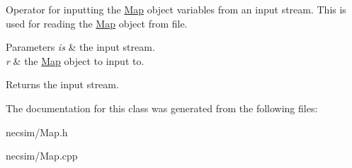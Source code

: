 Operator for inputting the \hyperlink{class_map}{Map} object variables from an input stream. This is used for reading the \hyperlink{class_map}{Map} object from file. 


\begin{DoxyParams}{Parameters}
{\em is} & the input stream. \\
\hline
{\em r} & the \hyperlink{class_map}{Map} object to input to. \\
\hline
\end{DoxyParams}
\begin{DoxyReturn}{Returns}
the input stream. 
\end{DoxyReturn}


The documentation for this class was generated from the following files\+:\begin{DoxyCompactItemize}
\item 
necsim/Map.\+h\item 
necsim/Map.\+cpp\end{DoxyCompactItemize}
